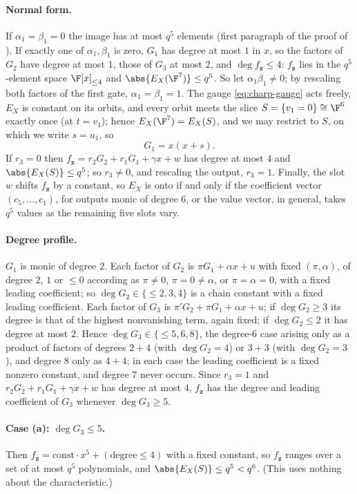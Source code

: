 \paragraph{Normal form.}
If $\alpha_1=\beta_1=0$ the image has at most $q^5$ elements (first paragraph of the proof
of ).  If exactly one of $\alpha_1,\beta_1$ is zero, $G_1$ has
degree at most $1$ in $x$, so the factors of $G_2$ have degree at most $1$, those of
$G_3$ at most $2$, and $\deg f_{\mathbf z}\le4$: $f_{\mathbf z}$ lies in the $q^5$-element
space $\F[x]_{\le4}$ and $\abs{E_X(\F^7)}\le q^5$.  So let $\alpha_1\beta_1\neq0$; by
rescaling both factors of the first gate, $\alpha_1=\beta_1=1$.  The gauge
\eqref{eq:charp-gauge} acts freely, $E_X$ is constant on its orbits, and every orbit meets
the slice $S=\{v_1=0\}\cong\F^6$ exactly once (at $t=v_1$); hence $E_X(\F^7)=E_X(S)$, and
we may restrict to $S$, on which we write $s=u_1$, so
\[
   G_1=x(x+s).
\]
If $r_3=0$ then $f_{\mathbf z}=r_2G_2+r_1G_1+\gamma x+w$ has degree at most $4$ and
$\abs{E_X(S)}\le q^5$; so $r_3\neq0$, and rescaling the output, $r_3=1$.  Finally, the
slot $w$ shifts $f_{\mathbf z}$ by a constant, so $E_X$ is onto if and only if the
coefficient vector $(c_5,\dots,c_1)$, for outputs monic of degree $6$, or the value vector,
in general, takes $q^5$ values as the remaining five slots vary.

\paragraph{Degree profile.}
$G_1$ is monic of degree $2$.  Each factor of $G_2$ is $\pi G_1+\alpha x+u$ with fixed
$(\pi,\alpha)$, of degree $2$, $1$ or $\le0$ according as $\pi\neq0$, $\pi=0\neq\alpha$,
or $\pi=\alpha=0$, with a fixed leading coefficient; so $\deg G_2\in\{\le2,3,4\}$ is a
chain constant with a fixed leading coefficient.  Each factor of $G_3$ is
$\pi'G_2+\pi G_1+\alpha x+u$; if $\deg G_2\ge3$ its degree is that of the highest
nonvanishing term, again fixed; if $\deg G_2\le2$ it has degree at most $2$.  Hence
$\deg G_3\in\{\le5,6,8\}$, the degree-$6$ case arising only as a product of factors of
degrees $2+4$ (with $\deg G_2=4$) or $3+3$ (with $\deg G_2=3$), and degree $8$ only as
$4+4$; in each case the leading coefficient is a fixed nonzero constant, and degree $7$
never occurs.  Since $r_3=1$ and $r_2G_2+r_1G_1+\gamma x+w$ has degree at most $4$,
$f_{\mathbf z}$ has the degree and leading coefficient of $G_3$ whenever $\deg G_3\ge5$.

\paragraph{Case (a): $\deg G_3\le5$.}
Then $f_{\mathbf z}=\mathrm{const}\cdot x^5+(\text{degree}\le4)$ with a fixed constant,
so $f_{\mathbf z}$ ranges over a set of at most $q^5$ polynomials, and
$\abs{E_X(S)}\le q^5<q^6$.  (This uses nothing about the characteristic.)

